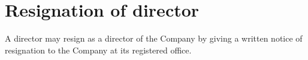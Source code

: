 \section{Resignation of director}

A director may resign as a director of the Company by giving a written notice of resignation to the Company at its registered office. 